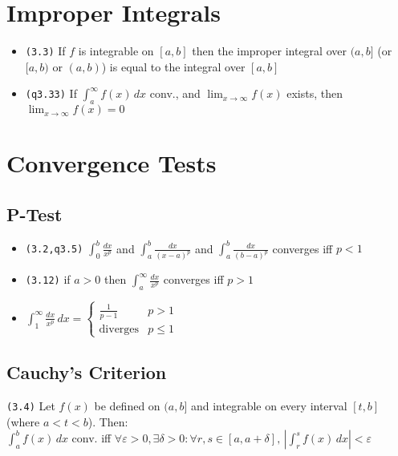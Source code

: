 \documentclass[a4paper,landscape]{article}
\newcommand{\tnum}[1]{{\color{gray}\footnotesize\texttt{(#1)}}}
\begin{document}
\begin{multicols}{2}

\section{Improper Integrals}

\begin{itemize}
    \item \tnum{3.3} If $f$ is integrable on $[a,b]$ then the improper integral over $(a,b]$ (or $[a,b)$ or $(a,b)$) is equal to the integral over $[a,b]$
    \item \tnum{q3.33} If $\displaystyle\int_a^{\infty}f(x) \, dx$ conv., and $\displaystyle\lim_{x\to\infty}f(x)$ exists, then $\displaystyle\lim_{x\to\infty}f(x)=0$
\end{itemize}


\setlength{\premulticols}{1pt}
\setlength{\postmulticols}{1pt}
\setlength{\multicolsep}{1pt}
\setlength{\columnsep}{1pt}



\section{Convergence Tests}

\subsection{P-Test}

\begin{itemize}
    \setlength\itemsep{0em}
    \item \tnum{3.2,q3.5} $\displaystyle\int _{0}^b\frac{dx}{x^p}$  and $\displaystyle\int _{a}^b\frac{dx}{(x-a)^p}$ and $\displaystyle\int _{a}^b\frac{dx}{(b-a)^p}$ converges iff $p<1$
    \item \tnum{3.12} if $a>0$ then $\displaystyle\int ^\infty_{a} \frac{dx}{x^p}$ converges iff $p>1$
    \item $\displaystyle\int ^\infty_{1}\frac{dx}{x^{p}} \, dx=\begin{cases} \frac{1}{p-1} &  p>1 \\ \text{diverges} & {p\leq 1}\end{cases}$
\end{itemize}


\subsection{Cauchy's Criterion}
\tnum{3.4} Let $f(x)$ be defined on $(a,b]$ and integrable on every interval $[t,b]$ (where $a<t<b$). Then: \\
 $\displaystyle\int ^b_{a}f(x) \, dx$ conv. iff $\forall\varepsilon>0,\exists \delta>0:\forall r,s\in[a,a+\delta],\,\displaystyle\left|\int ^s_{r}f(x) \, dx\right|<\varepsilon$


\end{multicols}
\end{document}
